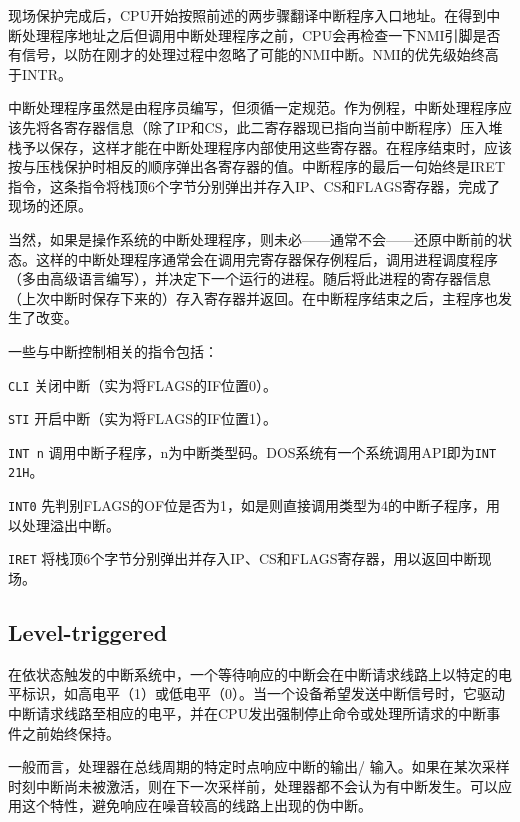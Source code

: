 现场保护完成后，CPU开始按照前述的两步骤翻译中断程序入口地址。在得到中断处理程序地址之后但调用中断处理程序之前，CPU会再检查一下NMI引脚是否有信号，以防在刚才的处理过程中忽略了可能的NMI中断。NMI的优先级始终高于INTR。

中断处理程序虽然是由程序员编写，但须循一定规范。作为例程，中断处理程序应该先将各寄存器信息（除了IP和CS，此二寄存器现已指向当前中断程序）压入堆栈予以保存，这样才能在中断处理程序内部使用这些寄存器。在程序结束时，应该按与压栈保护时相反的顺序弹出各寄存器的值。中断程序的最后一句始终是IRET指令，这条指令将栈顶6个字节分别弹出并存入IP、CS和FLAGS寄存器，完成了现场的还原。

当然，如果是操作系统的中断处理程序，则未必——通常不会——还原中断前的状态。这样的中断处理程序通常会在调用完寄存器保存例程后，调用进程调度程序（多由高级语言编写），并决定下一个运行的进程。随后将此进程的寄存器信息（上次中断时保存下来的）存入寄存器并返回。在中断程序结束之后，主程序也发生了改变。

一些与中断控制相关的指令包括：

\begin{compactenum}
\item \texttt{CLI} 关闭中断（实为将FLAGS的IF位置0）。
\item \texttt{STI} 开启中断（实为将FLAGS的IF位置1）。
\item \texttt{INT n} 调用中断子程序，n为中断类型码。DOS系统有一个系统调用API即为\texttt{INT 21H}。
\item \texttt{INT0} 先判别FLAGS的OF位是否为1，如是则直接调用类型为4的中断子程序，用以处理溢出中断。
\item \texttt{IRET} 将栈顶6个字节分别弹出并存入IP、CS和FLAGS寄存器，用以返回中断现场。
\end{compactenum}





\subsection{Level-triggered}


在依状态触发的中断系统中，一个等待响应的中断会在中断请求线路上以特定的电平标识，如高电平（1）或低电平（0）。当一个设备希望发送中断信号时，它驱动中断请求线路至相应的电平，并在CPU发出强制停止命令或处理所请求的中断事件之前始终保持。

一般而言，处理器在总线周期的特定时点响应中断的输出/ 输入。如果在某次采样时刻中断尚未被激活，则在下一次采样前，处理器都不会认为有中断发生。可以应用这个特性，避免响应在噪音较高的线路上出现的伪中断。

